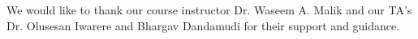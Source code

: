 %

\nocite{*}

\begin{acknowledgements}
We would like to thank our course instructor Dr. Waseem A. Malik and our TA's Dr. Olusesan Iwarere  and Bhargav Dandamudi for their support and guidance.
\end{acknowledgements}




\newpage





